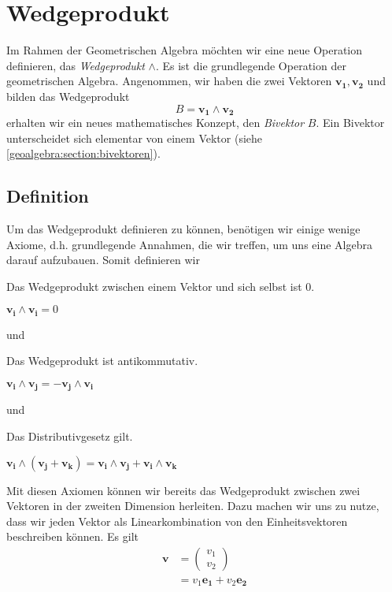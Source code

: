 
\section{Wedgeprodukt
\label{geoalgebra:section:wedgeprodukt}}

Im Rahmen der Geometrischen Algebra möchten wir eine neue Operation
definieren, das \emph{Wedgeprodukt} $\wedge$.
Es ist die grundlegende Operation der geometrischen
Algebra.
Angenommen, wir haben die
zwei Vektoren $\mathbf{v_1}, \mathbf{v_2}$ und bilden das Wedgeprodukt
\begin{equation}
  B = \mathbf{v_1} \wedge \mathbf{v_2}
\end{equation}
erhalten wir ein neues mathematisches Konzept, den \emph{Bivektor} $B$.
Ein Bivektor unterscheidet sich elementar von einem Vektor (siehe \ref{geoalgebra:section:bivektoren}).

\subsection{Definition}
Um das Wedgeprodukt definieren zu können, benötigen wir einige wenige Axiome, d.h. grundlegende Annahmen, die wir treffen,
um uns eine Algebra darauf aufzubauen. Somit definieren wir

\begin{satz}
  Das Wedgeprodukt zwischen einem Vektor und sich selbst ist 0.

  $
  \mathbf{v_i} \wedge \mathbf{v_i} = 0
  $
\end{satz}
und
\begin{satz}
Das Wedgeprodukt ist antikommutativ.

  $
  \mathbf{v_i} \wedge \mathbf{v_j} = -\mathbf{v_j} \wedge \mathbf{v_i}
  $
\end{satz}
und
\begin{satz}
Das Distributivgesetz gilt.

  $
  \mathbf{v_i} \wedge (\mathbf{v_j} + \mathbf{v_k}) = \mathbf{v_i} \wedge \mathbf{v_j} + \mathbf{v_i} \wedge \mathbf{v_k}
  $
\end{satz}

Mit diesen Axiomen können wir bereits das Wedgeprodukt zwischen zwei
Vektoren in der zweiten Dimension herleiten.
Dazu machen wir uns zu nutze, dass wir jeden Vektor als
Linearkombination von den Einheitsvektoren beschreiben können.
Es gilt
\begin{align}
  \mathbf{v} &= \begin{pmatrix} v_1 \\ v_2 \end{pmatrix} \\
    &= v_1 \mathbf{e_1} + v_2 \mathbf{e_2}
\end{align}


